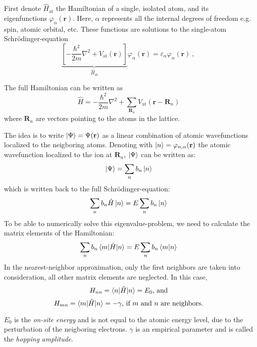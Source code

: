 \documentclass[11pt, a4paper, twocolumn]{article}
\newcommand{\bb}[1]{\mathbf{#1}}
\begin{document}
First denote $\hat H_{\textrm{at}}$ the Hamiltonian of a single, isolated atom, and its eigenfunctions $\varphi_{\alpha}(\bb r)$.
Here, $\alpha$ represents all the internal degrees of freedom e.g. spin, atomic orbital, etc.
These functions are solutions to the single-atom Schrödinger-equation
\begin{equation*}
  \underbrace{ \left[ -\frac{\hbar^2}{2m} \nabla^2 + V_{\textrm{at}}(\bb r) \right]}_{\hat H_{\textrm{at}}} \varphi_{\alpha}(\bb r)
  = \varepsilon_{\alpha}\varphi_{\alpha}({\bb r})~\textrm{, }
\end{equation*}

The full Hamiltonian can be written as
\begin{equation*}
  \hat H = -\frac{\hbar^2}{2m} \nabla^2 + \sum\limits_{\bb{R}_n} V_{\textrm{at}} (\bb r - \bb{R}_n)
\end{equation*}
where $\bb{R}_n$ are vectors pointing to the atoms in the lattice.

The idea is to write $\ket\Psi = \Psi(\bb r)$ as a linear combination of atomic wavefunctions localized to the neigboring atoms.
Denoting with $\ket n = \varphi_{n, \alpha}(\bb r)$ the atomic wavefunction localized to the ion at $\bb{R}_n$, $\ket\Psi$ can be
written as:
\begin{equation*}
  \ket\Psi = \sum\limits_{n} b_n \ket n
\end{equation*}
which is written back to the full Schrödinger-equation:
\begin{equation*}
  \sum\limits_n b_n \hat H \ket n = E \sum\limits_n b_n \ket n
\end{equation*}
To be able to numerically solve this eigenvalue-problem, we need to calculate the matrix elements of the 
Hamiltonian:
\begin{equation*}
  \sum\limits_n b_n \braket{m | \hat H | n} = E \sum\limits_n b_n \braket{m|n}
\end{equation*}
In the nearest-neighbor approximation, only the first neighbors are taken into consideration, all other matrix elements
are neglected.
In this case, 
\begin{equation*}
  H_{nn} = \braket{n|\hat H|n} = E_0 \textrm{, and}
\end{equation*}
\begin{equation*}
  H_{mn} = \braket{m|\hat H|n} = -\gamma \textrm{, if $m$ and $n$ are neighbors.}
\end{equation*}

$E_0$ is the \textit{on-site energy} and is not equal to the atomic energy level, due to the perturbation of the neigboring
electrons. $\gamma$ is an empirical parameter and is called the \textit{hopping amplitude}.
\end{document}
